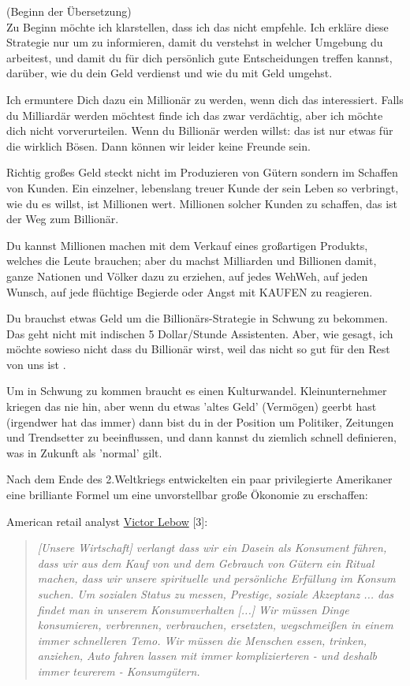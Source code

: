 (Beginn der Übersetzung) \\


Zu Beginn möchte ich klarstellen, dass ich das nicht empfehle. Ich erkläre diese Strategie nur um zu informieren, damit du verstehst in welcher Umgebung du arbeitest, und damit du für dich persönlich gute Entscheidungen treffen kannst, darüber, wie du dein Geld verdienst und wie du mit Geld umgehst.

Ich ermuntere Dich dazu ein Millionär zu werden, wenn dich das interessiert. Falls du Milliardär werden möchtest finde ich das zwar verdächtig, aber ich möchte dich nicht vorverurteilen. Wenn du Billionär werden willst: das ist nur etwas für die wirklich Bösen. Dann können wir leider keine Freunde sein.

Richtig großes Geld steckt nicht im Produzieren von Gütern sondern im Schaffen von Kunden. Ein einzelner, lebenslang treuer Kunde der sein Leben so verbringt, wie du es willst, ist Millionen wert. Millionen solcher Kunden zu schaffen, das ist der Weg zum Billionär.

Du kannst Millionen machen mit dem Verkauf eines großartigen Produkts, welches die Leute brauchen; aber du machst Milliarden und Billionen damit, ganze Nationen und Völker dazu zu erziehen, auf jedes WehWeh, auf jeden Wunsch, auf jede flüchtige Begierde oder Angst mit KAUFEN zu reagieren.

Du brauchst etwas Geld um die Billionärs-Strategie in Schwung zu bekommen. Das geht nicht mit indischen 5 Dollar/Stunde Assistenten. Aber, wie gesagt, ich  möchte sowieso nicht dass du Billionär wirst, weil das nicht so gut für den Rest von uns ist .

Um in Schwung zu kommen braucht es einen Kulturwandel. Kleinunternehmer kriegen das nie hin, aber wenn du etwas 'altes Geld' (Vermögen) geerbt hast (irgendwer hat das immer) dann bist du in der Position um Politiker, Zeitungen und Trendsetter zu beeinflussen, und dann kannst du ziemlich schnell definieren, was in Zukunft als 'normal' gilt.

Nach dem Ende des 2.Weltkriegs entwickelten ein paar privilegierte Amerikaner eine brilliante Formel um eine unvorstellbar große Ökonomie zu erschaffen:


American retail analyst \href{https://en.wikipedia.org/wiki/Victor_Lebow}{Victor Lebow} [3]:
\begin{quote}
\textit{
[Unsere Wirtschaft] verlangt dass wir ein Dasein als Konsument führen, dass wir aus dem Kauf von und dem Gebrauch von Gütern ein Ritual machen, dass wir unsere spirituelle und persönliche Erfüllung im Konsum suchen. Um sozialen Status zu messen, Prestige, soziale Akzeptanz ... das findet man in unserem Konsumverhalten [...] Wir müssen Dinge konsumieren, verbrennen, verbrauchen, ersetzten, wegschmeißen in einem immer schnelleren Temo. Wir müssen die Menschen essen, trinken, anziehen, Auto fahren lassen mit immer komplizierteren - und deshalb immer teurerem -  Konsumgütern.}
\end{quote} 

